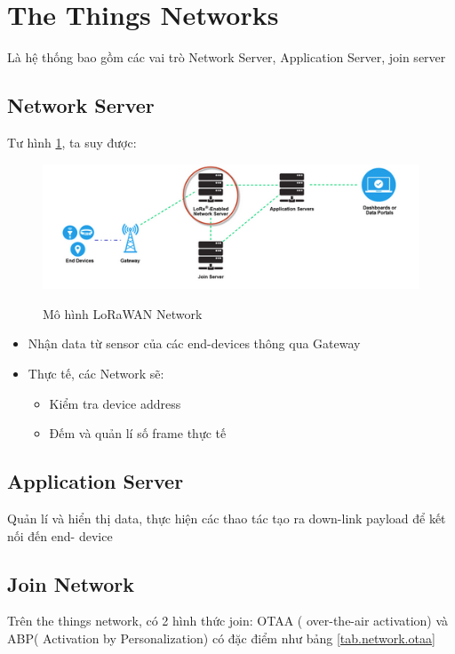 \section{The Things Networks}
Là hệ thống bao gồm các vai trò Network Server, Application Server, join server

\subsection{Network Server}
Tư hình \ref{fig:lorawan_network}, ta suy được:
\begin{figure}[h]
    \includegraphics[width=\textwidth]{images/Quanh/LoraWan_Netwrok.png}
    \caption{Mô hình LoRaWAN Network} \cite{lorawanoverview}
    \label{fig:lorawan_network}
\end{figure}

\begin{itemize}
    \item Nhận data từ sensor của các end-devices thông qua Gateway
    \item Thực tế, các Network sẽ:
    \begin{itemize}
        \item Kiểm tra device address
        \item Đếm và quản lí số frame thực tế
    \end{itemize}
\end{itemize}

\subsection{Application Server}
Quản lí và hiển thị data, thực hiện các thao tác tạo ra down-link payload để kết nối đến end- device

\subsection{Join Network}
Trên the things network, có 2 hình thức join: OTAA ( over-the-air activation) và ABP( Activation by Personalization) có đặc điểm như bảng \ref{tab.network.otaa}

